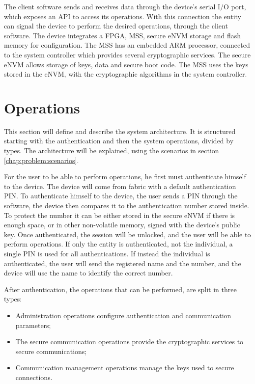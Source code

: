 The client software sends and receives data through the device's serial I/O port, which exposes an \ac{API} to access its operations.
With this connection the entity can signal the device to perform the desired operations, through the client software.
The device integrates a \ac{FPGA}, \ac{MSS}, secure eNVM storage and flash memory for configuration. The \ac{MSS} has an embedded ARM processor, connected to the system controller which provides several cryptographic services. The secure eNVM allows storage of keys, data and secure boot code.
The \ac{MSS} uses the keys stored in the eNVM, with the cryptographic algorithms in the system controller.

\section{Operations}\label{chap:arch:ops}

This section will define and describe the system architecture. It is structured starting with the authentication and then the system operations, divided by types.
The architecture will be explained, using the scenarios in section \ref{chap:problem:scenarios}.

For the user to be able to perform operations, he first must authenticate himself to the device. The device will come from fabric with a default authentication \ac{PIN}. To authenticate himself to the device, the user sends a \ac{PIN} through the software, the device then compares it to the authentication number stored inside. To protect the number it can be either stored in the secure eNVM if there is enough space, or in other non-volatile memory, signed with the device's public key. Once authenticated, the session will be unlocked, and the user will be able to perform operations.
If only the entity is authenticated, not the individual, a single \ac{PIN} is used for all authentications.
If instead the individual is authenticated, the user will send the registered name and the number, and the device will use the name to identify the correct number.

After authentication, the operations that can be performed, are split in three types:
\begin{itemize}
    \item Administration operations configure authentication and communication parameters;
    \item The secure communication operations provide the cryptographic services to secure communications;
    \item Communication management operations manage the keys used to secure connections.
\end{itemize}

